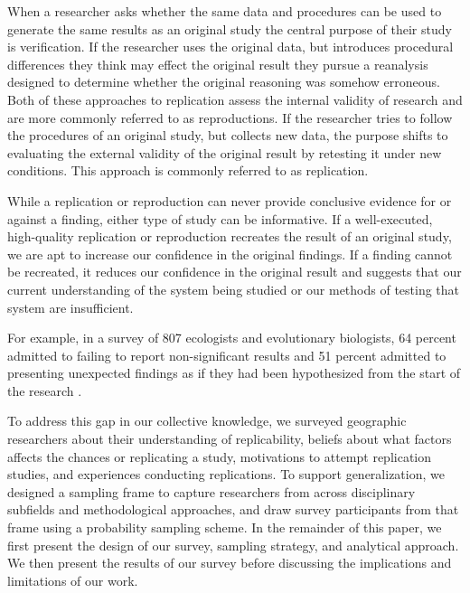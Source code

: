 \documentclass[]{interact}
\theoremstyle{plain}%
\theoremstyle{definition}
\theoremstyle{remark}
\begin{document}
When a researcher asks whether the same data and procedures can be used to generate the same results as an original study the central purpose of their study is verification.
If the researcher uses the original data, but introduces procedural differences they think may effect the original result they pursue a reanalysis designed to determine whether the original reasoning was somehow erroneous. 
Both of these approaches to replication assess the internal validity of research and are more commonly referred to as reproductions.
If the researcher tries to follow the procedures of an original study, but collects new data, the purpose shifts to evaluating the external validity of the original result by retesting it under new conditions.
This approach is commonly referred to as replication. 

While a replication or reproduction can never provide conclusive evidence for or against a finding, either type of study can be informative. 
If a well-executed, high-quality replication or reproduction recreates the result of an original study, we are apt to increase our confidence in the original findings. 
If a finding cannot be recreated, it reduces our confidence in the original result and suggests that our current understanding of the system being studied or our methods of testing that system are insufficient.

For example, in a survey of 807 ecologists and evolutionary biologists, 64 percent admitted to failing to report non-significant results and 51 percent admitted to presenting unexpected findings as if they had been hypothesized from the start of the research \citep{fraser2018questionable}.

To address this gap in our collective knowledge, we surveyed geographic researchers about their understanding of replicability, beliefs about what factors affects the chances or replicating a study, motivations to attempt replication studies, and experiences conducting replications.
To support generalization, we designed a sampling frame to capture researchers from across disciplinary subfields and methodological approaches, and draw survey participants from that frame using a probability sampling scheme.
In the remainder of this paper, we first present the design of our survey, sampling strategy, and analytical approach. 
We then present the results of our survey before discussing the implications and limitations of our work. 

\end{document}
